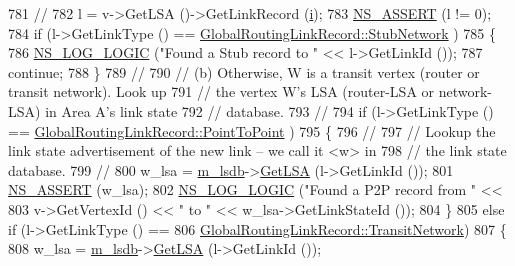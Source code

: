 \begin{DoxyCode}
781 \textcolor{comment}{//}
782           l = v->GetLSA ()->GetLinkRecord (\hyperlink{bernuolliDistribution_8m_a6f6ccfcf58b31cb6412107d9d5281426}{i});
783           \hyperlink{assert_8h_a6dccdb0de9b252f60088ce281c49d052}{NS\_ASSERT} (l != 0);
784           \textcolor{keywordflow}{if} (l->GetLinkType () == \hyperlink{classns3_1_1GlobalRoutingLinkRecord_a9380bcce9bca03943c4761b166a694f4a183ff8c880e05253fdca7bece2cad90b}{GlobalRoutingLinkRecord::StubNetwork}
      )
785             \{
786               \hyperlink{group__logging_ga88acd260151caf2db9c0fc84997f45ce}{NS\_LOG\_LOGIC} (\textcolor{stringliteral}{"Found a Stub record to "} << l->GetLinkId ());
787               \textcolor{keywordflow}{continue};
788             \}
789 \textcolor{comment}{//}
790 \textcolor{comment}{// (b) Otherwise, W is a transit vertex (router or transit network).  Look up}
791 \textcolor{comment}{// the vertex W's LSA (router-LSA or network-LSA) in Area A's link state}
792 \textcolor{comment}{// database. }
793 \textcolor{comment}{//}
794           \textcolor{keywordflow}{if} (l->GetLinkType () == \hyperlink{classns3_1_1GlobalRoutingLinkRecord_a9380bcce9bca03943c4761b166a694f4aa345c79cdcaba957f5e8296509183912}{GlobalRoutingLinkRecord::PointToPoint}
      )
795             \{
796 \textcolor{comment}{//}
797 \textcolor{comment}{// Lookup the link state advertisement of the new link -- we call it <w> in}
798 \textcolor{comment}{// the link state database.}
799 \textcolor{comment}{//}
800               w\_lsa = \hyperlink{classns3_1_1GlobalRouteManagerImpl_a7e528f818fa3e6c794b07c0b3cba5f61}{m\_lsdb}->\hyperlink{classns3_1_1GlobalRouteManagerLSDB_a3504bf3573cc64a056835684c41e1aa5}{GetLSA} (l->GetLinkId ());
801               \hyperlink{assert_8h_a6dccdb0de9b252f60088ce281c49d052}{NS\_ASSERT} (w\_lsa);
802               \hyperlink{group__logging_ga88acd260151caf2db9c0fc84997f45ce}{NS\_LOG\_LOGIC} (\textcolor{stringliteral}{"Found a P2P record from "} << 
803                             v->GetVertexId () << \textcolor{stringliteral}{" to "} << w\_lsa->GetLinkStateId ());
804             \}
805           \textcolor{keywordflow}{else} \textcolor{keywordflow}{if} (l->GetLinkType () == 
806                    \hyperlink{classns3_1_1GlobalRoutingLinkRecord_a9380bcce9bca03943c4761b166a694f4ad3d00014c9ba50539a53b55fce117856}{GlobalRoutingLinkRecord::TransitNetwork})
807             \{
808               w\_lsa = \hyperlink{classns3_1_1GlobalRouteManagerImpl_a7e528f818fa3e6c794b07c0b3cba5f61}{m\_lsdb}->\hyperlink{classns3_1_1GlobalRouteManagerLSDB_a3504bf3573cc64a056835684c41e1aa5}{GetLSA} (l->GetLinkId ());

\end{DoxyCode}
